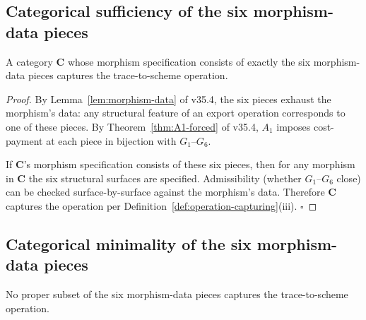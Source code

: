 \subsection{Categorical sufficiency of the six morphism-data pieces}
\label{subsec:cat-sufficiency}

\begin{lemma}
\label{lem:cat-sufficiency}
A category $\mathbf{C}$ whose morphism specification consists of exactly the six morphism-data pieces captures the trace-to-scheme operation.
\end{lemma}

\begin{proof}
By Lemma~\ref{lem:morphism-data} of v35.4, the six pieces exhaust the morphism's data: any structural feature of an export operation corresponds to one of these pieces. By Theorem~\ref{thm:A1-forced} of v35.4, $A_1$ imposes cost-payment at each piece in bijection with $G_1$--$G_6$.

If $\mathbf{C}$'s morphism specification consists of these six pieces, then for any morphism in $\mathbf{C}$ the six structural surfaces are specified. Admissibility (whether $G_1$--$G_6$ close) can be checked surface-by-surface against the morphism's data. Therefore $\mathbf{C}$ captures the operation per Definition~\ref{def:operation-capturing}(iii). $\square$
\end{proof}

\subsection{Categorical minimality of the six morphism-data pieces}
\label{subsec:cat-minimality}

\begin{lemma}
\label{lem:cat-minimality}
No proper subset of the six morphism-data pieces captures the trace-to-scheme operation.
\end{lemma}

